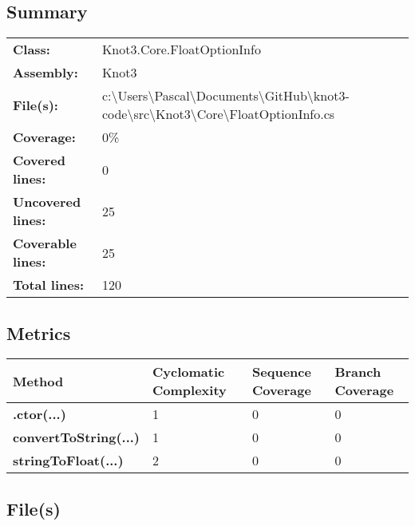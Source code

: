 \documentclass[a4paper,10pt]{article}
\begin{document}
\subsection{Summary}
\begin{longtable}[l]{ll}
\textbf{Class:} & Knot3.Core.FloatOptionInfo\\
\textbf{Assembly:} & Knot3\\
\textbf{File(s):} & \begin{minipage}[t]{12cm}{c:\textbackslash Users\textbackslash Pascal\textbackslash Documents\textbackslash GitHub\textbackslash knot3-code\textbackslash src\textbackslash Knot3\textbackslash Core\textbackslash FloatOptionInfo.cs}\end{minipage} \\
\textbf{Coverage:} & 0\%\\
\textbf{Covered lines:} & 0\\
\textbf{Uncovered lines:} & 25\\
\textbf{Coverable lines:} & 25\\
\textbf{Total lines:} & 120\\
\end{longtable}
\subsection{Metrics}
\begin{longtable}[l]{|l|l|l|l|}
\hline
\textbf{Method} & \textbf{Cyclomatic Complexity} & \textbf{Sequence Coverage} & \textbf{Branch Coverage}\\
\hline
\textbf{.ctor(...)} & 1 & 0 & 0\\
\hline
\textbf{convertToString(...)} & 1 & 0 & 0\\
\hline
\textbf{stringToFloat(...)} & 2 & 0 & 0\\
\hline
\end{longtable}
\subsection{File(s)}
\end{document}
